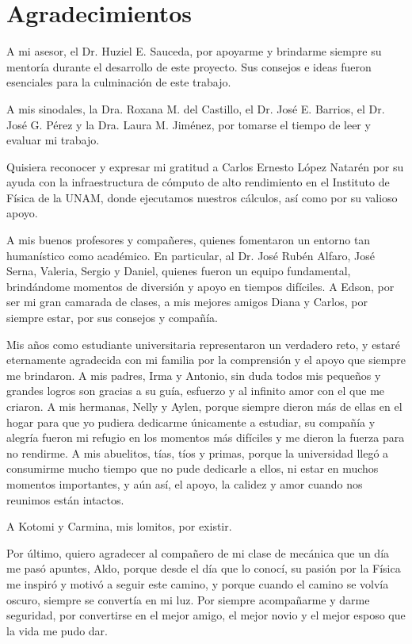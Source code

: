 
\bigskip

\begingroup
\let\clearpage\relax
\let\cleardoublepage\relax
\let\cleardoublepage\relax
\chapter*{Agradecimientos}

A mi asesor, el Dr. Huziel E. Sauceda, por apoyarme y brindarme siempre su mentoría durante el desarrollo de este proyecto. Sus consejos e ideas fueron esenciales para la culminación de este trabajo.

A mis sinodales, la Dra. Roxana M. del Castillo, el Dr. José E. Barrios, el Dr. José G. Pérez y la Dra. Laura M. Jiménez, por tomarse el tiempo de leer y evaluar mi trabajo.

Quisiera reconocer y expresar mi gratitud a Carlos Ernesto López Natarén por su ayuda con la infraestructura de cómputo de alto rendimiento en el Instituto de Física de la UNAM, donde ejecutamos nuestros cálculos, así como por su valioso apoyo.

A mis buenos profesores y compañeres, quienes fomentaron un entorno tan humanístico como académico. En particular, al Dr. José Rubén Alfaro, José Serna, Valeria, Sergio y Daniel, quienes fueron un equipo fundamental, brindándome momentos de diversión y apoyo en tiempos difíciles. A Edson, por ser mi gran camarada de clases, a mis mejores amigos Diana y Carlos, por siempre estar, por sus consejos y compañía.

Mis años como estudiante universitaria representaron un verdadero reto, y estaré eternamente agradecida con mi familia por la comprensión y el apoyo que siempre me brindaron. A mis padres, Irma y Antonio, sin duda todos mis pequeños y grandes logros son gracias a su guía, esfuerzo y al infinito amor con el que me criaron. A mis hermanas, Nelly y Aylen, porque siempre dieron más de ellas en el hogar para que yo pudiera dedicarme únicamente a estudiar, su compañía y alegría fueron mi refugio en los momentos más difíciles y me dieron la fuerza para no rendirme. A mis abuelitos, tías, tíos y primas, porque la universidad llegó a consumirme mucho tiempo que no pude dedicarle a ellos, ni estar en muchos momentos importantes, y aún así, el apoyo, la calidez y amor cuando nos reunimos están intactos.

A Kotomi y Carmina, mis lomitos, por existir.

Por último, quiero agradecer al compañero de mi clase de mecánica que un día me pasó apuntes, Aldo, porque desde el día que lo conocí, su pasión por la Física me inspiró y motivó a seguir este camino, y porque cuando el camino se volvía oscuro, siempre se convertía en mi luz. Por siempre acompañarme y darme seguridad, por convertirse en el mejor amigo, el mejor novio y el mejor esposo que la vida me pudo dar.
\endgroup

